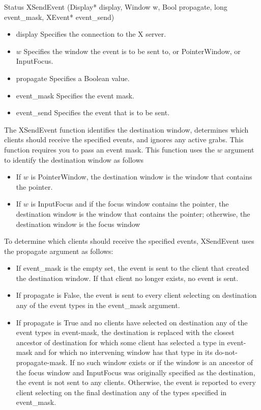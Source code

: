 \documentclass{report}
\begin{document}
\begin{itemize}
            \bigbreak \noindent 
            \begin{cppcode}
            Status XSendEvent (Display* display, Window w, Bool propagate, long event_mask, XEvent* event_send)
            \end{cppcode}
            \begin{itemize}
                \item display Specifies the connection to the X server.
                \item $w$ Specifies the window the event is to be sent to, or PointerWindow, or InputFocus.
                \item propagate Specifies a Boolean value.
                \item event\_mask Specifies the event mask.
                \item event\_send Specifies the event that is to be sent.
            \end{itemize}
            The XSendEvent function identifies the destination window, determines which clients should receive the specified events, and ignores any active grabs. This function requires you to pass an event mask. 
            \bigbreak \noindent 
            This function uses the $w$ argument to identify the destination window as follows
            \begin{itemize}
                \item If $w$ is PointerWindow, the destination window is the window that contains the pointer.
                \item If $w$ is InputFocus and if the focus window contains the pointer, the destination window is the window that contains the pointer; otherwise, the destination window is the focus window
            \end{itemize}
            To determine which clients should receive the specified events, XSendEvent uses the propagate argument as follows:
            \begin{itemize}
                \item If event\_mask is the empty set, the event is sent to the client that created the destination window. If that client no longer exists, no event is sent.
                \item If propagate is False, the event is sent to every client selecting on destination any of the event types in the event\_mask argument.
                \item If propagate is True and no clients have selected on destination any of the event types in event-mask, the destination is replaced with the closest ancestor of destination for which some client has selected a type in event-mask and for which no intervening window has that type in its do-not-propagate-mask. If no such window exists or if the window is an ancestor of the focus window and InputFocus was originally specified as the destination, the event is not sent to any clients. Otherwise, the event is reported to every client selecting on the final destination any of the types specified in event\_mask.

\end{itemize}
\end{itemize}
\end{document}
